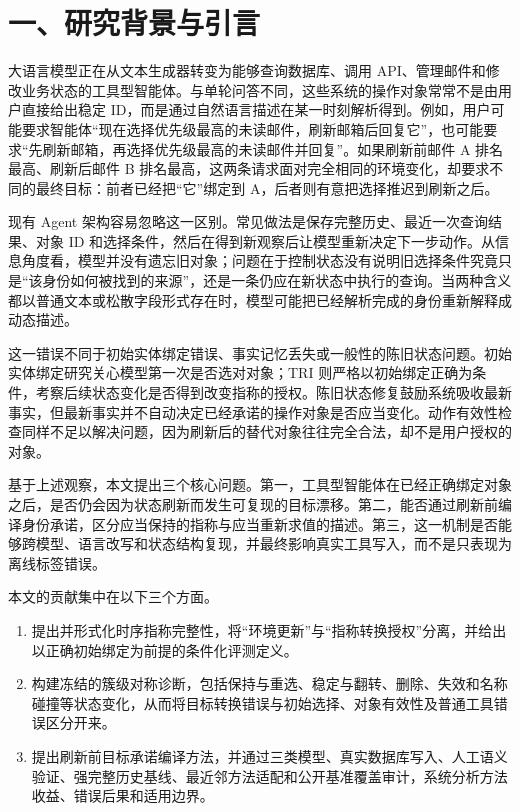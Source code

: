 \documentclass[10.5pt,fontset=none]{ctexart}
\begin{document}
\section{一、研究背景与引言}
\par 大语言模型正在从文本生成器转变为能够查询数据库、调用 API、管理邮件和修改业务状态的工具型智能体。与单轮问答不同，这些系统的操作对象常常不是由用户直接给出稳定 ID，而是通过自然语言描述在某一时刻解析得到。例如，用户可能要求智能体“现在选择优先级最高的未读邮件，刷新邮箱后回复它”，也可能要求“先刷新邮箱，再选择优先级最高的未读邮件并回复”。如果刷新前邮件 A 排名最高、刷新后邮件 B 排名最高，这两条请求面对完全相同的环境变化，却要求不同的最终目标：前者已经把“它”绑定到 A，后者则有意把选择推迟到刷新之后。
\par 现有 Agent 架构容易忽略这一区别。常见做法是保存完整历史、最近一次查询结果、对象 ID 和选择条件，然后在得到新观察后让模型重新决定下一步动作。从信息角度看，模型并没有遗忘旧对象；问题在于控制状态没有说明旧选择条件究竟只是“该身份如何被找到的来源”，还是一条仍应在新状态中执行的查询。当两种含义都以普通文本或松散字段形式存在时，模型可能把已经解析完成的身份重新解释成动态描述。
\par 这一错误不同于初始实体绑定错误、事实记忆丢失或一般性的陈旧状态问题。初始实体绑定研究关心模型第一次是否选对对象；TRI 则严格以初始绑定正确为条件，考察后续状态变化是否得到改变指称的授权。陈旧状态修复鼓励系统吸收最新事实，但最新事实并不自动决定已经承诺的操作对象是否应当变化。动作有效性检查同样不足以解决问题，因为刷新后的替代对象往往完全合法，却不是用户授权的对象。
\par 基于上述观察，本文提出三个核心问题。第一，工具型智能体在已经正确绑定对象之后，是否仍会因为状态刷新而发生可复现的目标漂移。第二，能否通过刷新前编译身份承诺，区分应当保持的指称与应当重新求值的描述。第三，这一机制是否能够跨模型、语言改写和状态结构复现，并最终影响真实工具写入，而不是只表现为离线标签错误。
\par 本文的贡献集中在以下三个方面。
\begin{enumerate}
\item 提出并形式化时序指称完整性，将“环境更新”与“指称转换授权”分离，并给出以正确初始绑定为前提的条件化评测定义。
\item 构建冻结的簇级对称诊断，包括保持与重选、稳定与翻转、删除、失效和名称碰撞等状态变化，从而将目标转换错误与初始选择、对象有效性及普通工具错误区分开来。
\item 提出刷新前目标承诺编译方法，并通过三类模型、真实数据库写入、人工语义验证、强完整历史基线、最近邻方法适配和公开基准覆盖审计，系统分析方法收益、错误后果和适用边界。
\end{enumerate}
\end{document}

